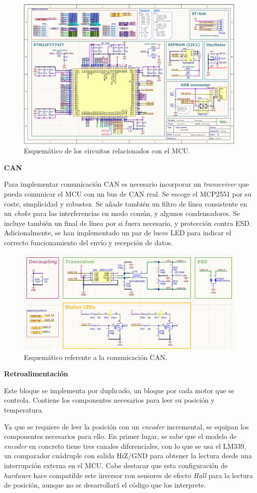 \begin{figure}[H]
	\centering
	\includegraphics[width=0.7\linewidth]{fig/schMCUcontrol}
	\caption{Esquemático de los circuitos relacionados con el MCU.}
\end{figure}
 
\textbf{CAN}

Para implementar comunicación CAN es necesario incorporar un \textit{transceiver} que pueda comunicar el MCU con un bus de CAN real. Se escoge el MCP2551 por su coste, simplicidad y robustez. Se añade también un filtro de línea consistente en un \textit{choke} para las interferencias en modo común, y algunos condensadores. Se incluye también un final de línea por si fuera necesario, y protección contra ESD. Adicionalmente, se han implementado un par de luces LED para indicar el correcto funcionamiento del envío y recepción de datos.

\begin{figure}[H]
	\centering
	\includegraphics[width=0.7\linewidth]{fig/schCANcontrol}
	\caption{Esquemático referente a la comunicación CAN.}
\end{figure}

\textbf{Retroalimentación}

Este bloque se implementa por duplicado, un bloque por cada motor que se controla. Contiene los componentes necesarios para leer su posición y temperatura.

Ya que se requiere de leer la posición con un \textit{encoder} incremental, se equipan los componentes necesarios para ello. En primer lugar, se sabe que el modelo de \textit{encoder} en concreto tiene tres canales diferenciales, con lo que se usa el LM339, un comparador cuádruple con salida HiZ/GND para obtener la lectura desde una interrupción externa en el MCU. Cabe destacar que esta configuración de \textit{hardware} hace compatible este inversor con sensores de efecto \textit{Hall} para la lectura de posición, aunque no se desarrollará el código que los interprete.


